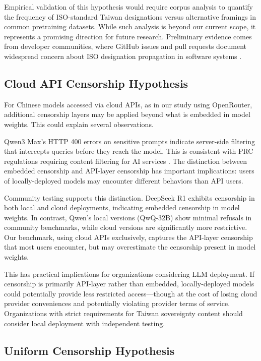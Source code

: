 \documentclass[11pt,a4paper]{article}
\begin{document}
Empirical validation of this hypothesis would require corpus analysis to quantify the frequency of ISO-standard Taiwan designations versus alternative framings in common pretraining datasets. While such analysis is beyond our current scope, it represents a promising direction for future research. Preliminary evidence comes from developer communities, where GitHub issues and pull requests document widespread concern about ISO designation propagation in software systems \citep{github2024iso}.

\subsection{Cloud API Censorship Hypothesis}

For Chinese models accessed via cloud APIs, as in our study using OpenRouter, additional censorship layers may be applied beyond what is embedded in model weights. This could explain several observations.

Qwen3 Max's HTTP 400 errors on sensitive prompts indicate server-side filtering that intercepts queries before they reach the model. This is consistent with PRC regulations requiring content filtering for AI services \citep{china2020provisions}. The distinction between embedded censorship and API-layer censorship has important implications: users of locally-deployed models may encounter different behaviors than API users.

Community testing supports this distinction. DeepSeek R1 exhibits censorship in both local and cloud deployments, indicating embedded censorship in model weights. In contrast, Qwen's local versions (QwQ-32B) show minimal refusals in community benchmarks, while cloud versions are significantly more restrictive. Our benchmark, using cloud APIs exclusively, captures the API-layer censorship that most users encounter, but may overestimate the censorship present in model weights.

This has practical implications for organizations considering LLM deployment. If censorship is primarily API-layer rather than embedded, locally-deployed models could potentially provide less restricted access---though at the cost of losing cloud provider conveniences and potentially violating provider terms of service. Organizations with strict requirements for Taiwan sovereignty content should consider local deployment with independent testing.

\subsection{Uniform Censorship Hypothesis}
\end{document}
